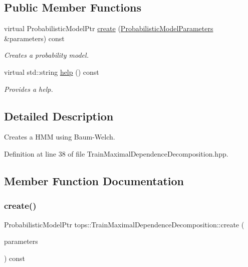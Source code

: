 \subsection*{Public Member Functions}
\begin{DoxyCompactItemize}
\item 
virtual Probabilistic\+Model\+Ptr \hyperlink{classtops_1_1TrainMaximalDependenceDecomposition_a5a46f3f1f25d021766099e3dc6a470e6}{create} (\hyperlink{classtops_1_1ProbabilisticModelParameters}{Probabilistic\+Model\+Parameters} \&parameters) const
\begin{DoxyCompactList}\small\item\em Creates a probability model. \end{DoxyCompactList}\item 
\mbox{\label{classtops_1_1TrainMaximalDependenceDecomposition_a253d78fc2415582241022a2faa0d999d}} 
virtual std\+::string \hyperlink{classtops_1_1TrainMaximalDependenceDecomposition_a253d78fc2415582241022a2faa0d999d}{help} () const
\begin{DoxyCompactList}\small\item\em Provides a help. \end{DoxyCompactList}\end{DoxyCompactItemize}


\subsection{Detailed Description}
Creates a H\+MM using Baum-\/\+Welch. 

Definition at line 38 of file Train\+Maximal\+Dependence\+Decomposition.\+hpp.



\subsection{Member Function Documentation}
\mbox{\label{classtops_1_1TrainMaximalDependenceDecomposition_a5a46f3f1f25d021766099e3dc6a470e6}} 
\subsubsection{\texorpdfstring{create()}{create()}}
{\footnotesize\ttfamily Probabilistic\+Model\+Ptr tops\+::\+Train\+Maximal\+Dependence\+Decomposition\+::create (\begin{DoxyParamCaption}\item[{\hyperlink{classtops_1_1ProbabilisticModelParameters}{Probabilistic\+Model\+Parameters} \&}]{parameters }\end{DoxyParamCaption}) const\hspace{0.3cm}{\ttfamily [virtual]}}



